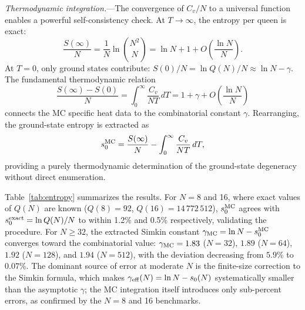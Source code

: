 \documentclass{iopjournal}
\begin{document}
\textit{Thermodynamic integration.}---The convergence of $C_v/N$ to
a universal function enables a powerful self-consistency check.  At
$T \to \infty$, the entropy per queen is exact:
\begin{equation}
  \frac{S(\infty)}{N}
  = \frac{1}{N}\ln\binom{N^2}{N}
  = \ln N + 1 + O\!\left(\frac{\ln N}{N}\right).
  \label{eq:Sinf}
\end{equation}
At $T = 0$, only ground states contribute:
$S(0)/N = \ln Q(N)/N \approx \ln N - \gamma$.
The fundamental thermodynamic relation
\begin{equation}
  \frac{S(\infty) - S(0)}{N}
  = \int_0^\infty \frac{C_v}{NT}\,dT
  = 1 + \gamma + O\!\left(\frac{\ln N}{N}\right)
  \label{eq:DS}
\end{equation}
connects the MC specific heat data to the combinatorial constant
$\gamma$.  Rearranging, the ground-state entropy is extracted as
\begin{equation}
  s_0^{\rm MC}
  = \frac{S(\infty)}{N} - \int_0^\infty \frac{C_v}{NT}\,dT,
  \label{eq:s0_MC}
\end{equation}
providing a purely thermodynamic determination of the ground-state
degeneracy without direct enumeration.

Table~\ref{tab:entropy} summarizes the results.  For $N = 8$ and
16, where exact values of $Q(N)$ are known ($Q(8) = 92$,
$Q(16) = 14\,772\,512$), $s_0^{\rm MC}$ agrees with
$s_0^{\rm exact} = \ln Q(N)/N$ to within 1.2\% and 0.5\%
respectively, validating the procedure.  For $N \ge 32$, the
extracted Simkin constant
$\gamma_{\rm MC} = \ln N - s_0^{\rm MC}$ converges toward the
combinatorial value: $\gamma_{\rm MC} = 1.83$ ($N = 32$),
$1.89$ ($N = 64$), $1.92$ ($N = 128$), and $1.94$ ($N = 512$),
with the deviation decreasing from $5.9\%$ to $0.07\%$.
The dominant source of error at moderate $N$ is the finite-size
correction to the Simkin formula, which makes
$\gamma_{\rm eff}(N) = \ln N - s_0(N)$ systematically smaller
than the asymptotic $\gamma$; the MC integration itself introduces
only sub-percent errors, as confirmed by the $N = 8$ and 16
benchmarks.
\end{document}
